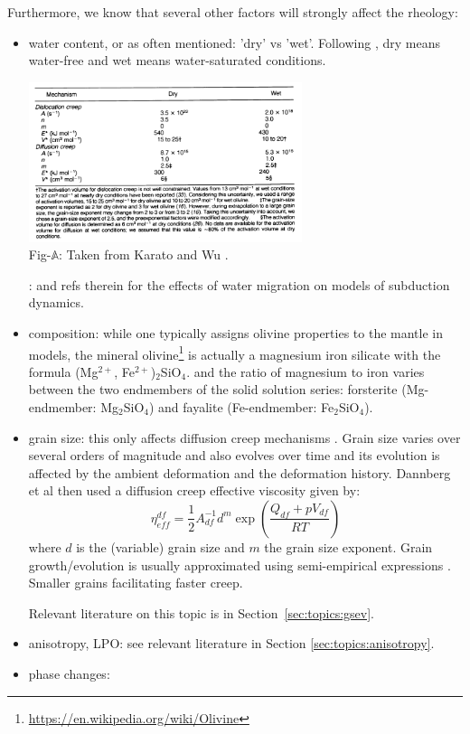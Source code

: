 Furthermore, we know that several other factors will strongly affect the rheology:
\begin{itemize}
\item water content, or as often mentioned: 'dry' vs 'wet'. Following \cite{kawu93}, 
dry means water-free and wet means water-saturated conditions.
\begin{center}
\includegraphics[width=8cm]{images/rheology/kawu93}\\
{\captionfont Fig-$\mathds{A}$: Taken from Karato and Wu \cite{kawu93}.}
\end{center}
\Literature: \cite{qubu14} and refs therein for the effects of water
migration on models of subduction dynamics.

\item composition: while one typically assigns olivine properties to the mantle in models, 
the mineral olivine\footnote{\url{https://en.wikipedia.org/wiki/Olivine}} 
is actually a magnesium iron silicate with the formula (Mg$^{2+}$, Fe$^{2+}$)$_2$SiO$_4$.
and the ratio of magnesium to iron varies between the two endmembers of the solid solution series: 
forsterite (Mg-endmember: Mg$_2$SiO$_4$) and fayalite (Fe-endmember: Fe$_2$SiO$_4$).

\item grain size: this only affects diffusion creep mechanisms \cite{kawu93}. 
Grain size varies over several orders of magnitude and also evolves over time and 
its evolution is affected by the ambient deformation and the deformation history.
Dannberg et al \cite{daef17} then used a diffusion creep effective viscosity 
given by:
\[
\eta_{eff}^{df} = \frac{1}{2} A_{df}^{-1} d^m \exp \left( \frac{Q_{df}+pV_{df}}{RT}  \right)
\] 
where $d$ is the (variable) grain size and $m$ the grain size exponent. Grain growth/evolution 
is usually approximated using semi-empirical expressions \cite[section~2.2]{daef17}.
Smaller grains facilitating faster creep.

Relevant literature on this topic is in Section~\ref{sec:topics:gsev}.

\item anisotropy, LPO: see relevant literature in Section \ref{sec:topics:anisotropy}.

\item phase changes: 

\end{itemize}

